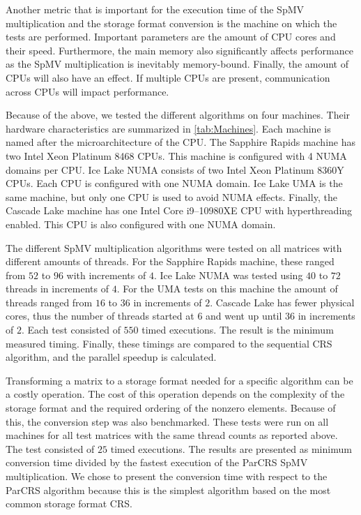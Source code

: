 \documentclass{siamart220329}
\begin{document}


Another metric that is important for the execution time of the SpMV multiplication and the storage format conversion is the machine on which the tests are performed. Important parameters are the amount of CPU cores and their speed. Furthermore, the main memory also significantly affects performance as the SpMV multiplication is inevitably memory-bound. Finally, the amount of CPUs will also have an effect. If multiple CPUs are present, communication across CPUs will impact performance. 

Because of the above, we tested the different algorithms on four machines. Their hardware characteristics are summarized in \cref{tab:Machines}. Each machine is named after the microarchitecture of the CPU. The Sapphire Rapids machine has two Intel Xeon Platinum 8468 CPUs. This machine is configured with 4 NUMA domains per CPU. Ice Lake NUMA consists of two Intel Xeon Platinum 8360Y CPUs. Each CPU is configured with one NUMA domain. Ice Lake UMA is the same machine, but only one CPU is used to avoid NUMA effects. Finally, the Cascade Lake machine has one Intel Core i9--10980XE CPU with hyperthreading enabled. This CPU is also configured with one NUMA domain.




The different SpMV multiplication algorithms were tested on all matrices with different amounts of threads. For the Sapphire Rapids machine, these ranged from $52$ to $96$ with increments of $4$. Ice Lake NUMA was tested using $40$ to $72$ threads in increments of $4$. For the UMA tests on this machine the amount of threads ranged from $16$ to $36$ in increments of $2$. Cascade Lake has fewer physical cores, thus the number of threads started at $6$ and went up until $36$ in increments of $2$. Each test consisted of $550$ timed executions. The result is the minimum measured timing. Finally, these timings are compared to the sequential CRS algorithm, and the parallel speedup is calculated.

Transforming a matrix to a storage format needed for a specific algorithm can be a costly operation. The cost of this operation depends on the complexity of the storage format and the required ordering of the nonzero elements. Because of this, the conversion step was also benchmarked. These tests were run on all machines for all test matrices with the same thread counts as reported above. The test consisted of $25$ timed executions. The results are presented as minimum conversion time divided by the fastest execution of the ParCRS SpMV multiplication. We chose to present the conversion time with respect to the ParCRS algorithm because this is the simplest algorithm based on the most common storage format CRS.
\end{document}
